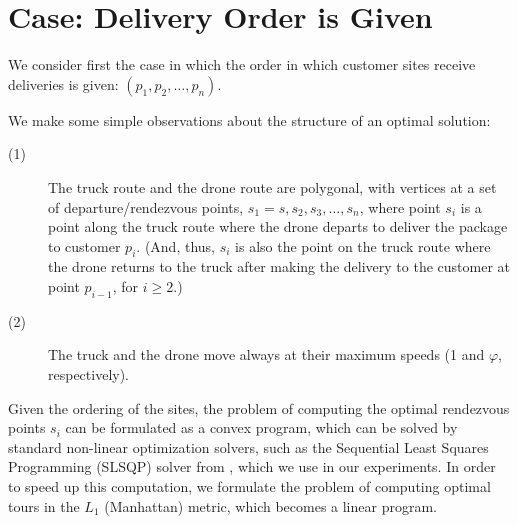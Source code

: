 \documentclass[conference]{IEEEtran}
\begin{document}
\section{Case: Delivery Order is Given}

We consider first the case in which the order in which customer sites
receive deliveries is given: $(p_1,p_2,\ldots,p_n)$.

We make some simple observations about the structure of an optimal solution:
\begin{description}
  \item[(1)] The truck route and the drone route are polygonal, with vertices
at a set of departure/rendezvous points, $s_1=s, s_2, s_3,\ldots,s_n$, where
point $s_i$ is a point along the truck route where the drone departs
to deliver the package to customer $p_i$. (And, thus, $s_i$ is also
the point on the truck route where the drone returns to the truck
after making the delivery to the customer at point $p_{i-1}$, for
$i\geq 2$.)
\item[(2)] The truck and the drone move always at their maximum speeds (1 and $\varphi$, respectively).
\end{description}

Given the ordering of the sites, the problem of computing the optimal
rendezvous points $s_i$ can be formulated as a convex program, which
can be solved by standard non-linear optimization solvers, such as the
Sequential Least Squares Programming (SLSQP) solver from \cite{slsqp},
which we use in our experiments. In order to speed up this
computation, we formulate the problem of computing optimal tours in
the $L_1$ (Manhattan) metric, which becomes a linear program.
\end{document}
